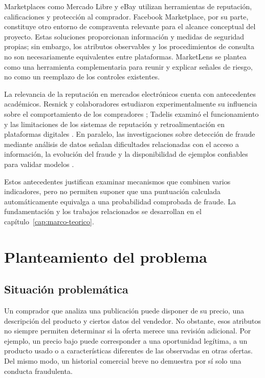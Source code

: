 Marketplaces como Mercado Libre y eBay utilizan herramientas de reputación, calificaciones y protección al comprador. Facebook Marketplace, por su parte, constituye otro entorno de compraventa relevante para el alcance conceptual del proyecto. Estas soluciones proporcionan información y medidas de seguridad propias; sin embargo, los atributos observables y los procedimientos de consulta no son necesariamente equivalentes entre plataformas. MarketLens se plantea como una herramienta complementaria para reunir y explicar señales de riesgo, no como un reemplazo de los controles existentes.

La relevancia de la reputación en mercados electrónicos cuenta con antecedentes académicos. Resnick y colaboradores estudiaron experimentalmente su influencia sobre el comportamiento de los compradores \parencite{ml-resnick-2006}; Tadelis examinó el funcionamiento y las limitaciones de los sistemas de reputación y retroalimentación en plataformas digitales \parencite{ml-tadelis-2016}. En paralelo, las investigaciones sobre detección de fraude mediante análisis de datos señalan dificultades relacionadas con el acceso a información, la evolución del fraude y la disponibilidad de ejemplos confiables para validar modelos \parencite{ml-phua-2010}.

Estos antecedentes justifican examinar mecanismos que combinen varios indicadores, pero no permiten suponer que una puntuación calculada automáticamente equivalga a una probabilidad comprobada de fraude. La fundamentación y los trabajos relacionados se desarrollan en el capítulo~\ref{cap:marco-teorico}.

\section{Planteamiento del problema}\label{sec:ml-problema-intro}

\subsection{Situación problemática}\label{subsec:ml-situacion}

Un comprador que analiza una publicación puede disponer de su precio, una descripción del producto y ciertos datos del vendedor. No obstante, esos atributos no siempre permiten determinar si la oferta merece una revisión adicional. Por ejemplo, un precio bajo puede corresponder a una oportunidad legítima, a un producto usado o a características diferentes de las observadas en otras ofertas. Del mismo modo, un historial comercial breve no demuestra por sí solo una conducta fraudulenta.

